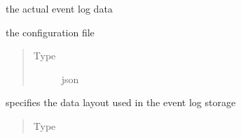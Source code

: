 \documentclass[letterpaper,10pt,english]{sphinxmanual}
\begin{document}
\begin{fulllineitems}
\begin{fulllineitems}
\label{\detokenize{event_log_analyzer:event_log_analyzer.event_log.EventLogStorage._dataframe}}
\sphinxAtStartPar
the actual event log data

\end{fulllineitems}


\begin{fulllineitems}
\label{\detokenize{event_log_analyzer:event_log_analyzer.event_log.EventLogStorage._config}}
\sphinxAtStartPar
the configuration file
\begin{quote}\begin{description}
\item[{Type}] \leavevmode
\sphinxAtStartPar
json

\end{description}\end{quote}

\end{fulllineitems}


\begin{fulllineitems}
\label{\detokenize{event_log_analyzer:event_log_analyzer.event_log.EventLogStorage._storage_type}}
\sphinxAtStartPar
specifies the data layout used in the event log storage
\begin{quote}\begin{description}
\item[{Type}] \leavevmode
\sphinxAtStartPar
{\hyperref[\detokenize{event_log_analyzer:event_log_analyzer.event_log.StorageType}]{}}

\end{description}\end{quote}

\end{fulllineitems}



\end{fulllineitems}
\end{document}
